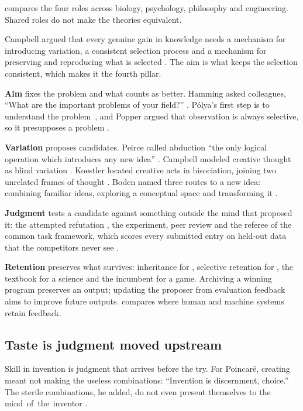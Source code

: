  compares the four roles across biology, psychology,
philosophy and engineering. Shared roles do not make the theories
equivalent.

Campbell argued that every genuine gain in knowledge needs a mechanism for introducing variation, a consistent selection process and a mechanism for preserving and reproducing what is selected \citep[p.~381]{campbell1960bvsr}. The aim is what keeps the selection consistent, which makes it the fourth pillar.

\textbf{Aim} fixes the problem and what counts as better. Hamming asked colleagues, ``What are the important problems of your field?'' \citep{hamming1986research}. Pólya's first step is to understand the \mbox{problem \citep{polya1945solve},} and Popper argued that observation is always selective, so it presupposes a problem \citep{popper1963conjectures}.

\textbf{Variation} proposes candidates. Peirce called abduction ``the only logical operation which introduces any new idea'' \citep[CP~5.171]{peirce1934cp}. Campbell modeled creative thought as blind variation \citep{campbell1960bvsr,simonton2011bvsr}. Koestler located creative acts in bisociation, joining two unrelated frames of thought \citep{koestler1964act}. Boden named three routes to a new idea: combining familiar ideas, exploring a conceptual space and transforming it \citep{boden1998creativity}.

\textbf{Judgment} tests a candidate against something outside the mind that proposed it: the attempted refutation \citep{popper1959logic}, the experiment, peer review and the referee of the common task framework, which scores every submitted entry on held-out data that the competitors never see \citep{donoho2017fifty}.

\textbf{Retention} preserves what survives: inheritance for
\citet{darwin1859origin}, selective retention for
\citet{campbell1960bvsr}, the textbook for a science and the incumbent for a
game. Archiving a winning program preserves an output; updating the proposer
from evaluation feedback aims to improve future outputs.
 compares where human and machine systems retain feedback.

\subsection{Taste is judgment moved upstream}\label{sub:anatomy-taste}

Skill in invention is judgment that arrives before the try. For Poincaré, creating meant not making the useless combinations: ``Invention is discernment, choice.'' The sterile combinations, he added, do not even present themselves to the \mbox{mind of the inventor} \citep[pp.~324--325]{poincare1910creation}.

